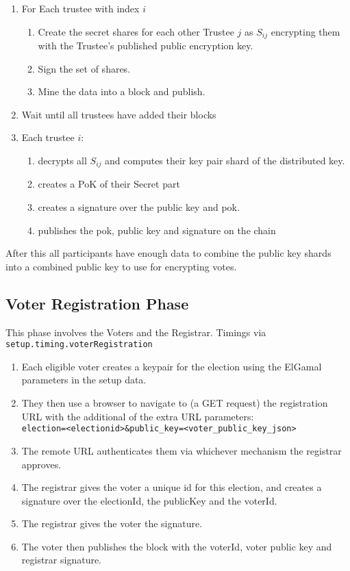 
\begin{enumerate}
    \item For Each trustee with index $i$
          \begin{enumerate}
              \item Create the secret shares for each other Trustee $j$ as $S_{ij}$ encrypting them with the Trustee's published public encryption key.
              \item Sign the set of shares.
              \item Mine the data into a block and publish.
          \end{enumerate}
    \item Wait until all trustees have added their blocks
    \item Each trustee $i$:
          \begin{enumerate}
              \item decrypts all $S_{ij}$ and computes their key pair shard of the distributed key.
              \item creates a PoK of their Secret part
              \item creates a signature over the public key and pok.
              \item publishes the pok, public key and signature on the chain
          \end{enumerate}
\end{enumerate}

After this all participants have enough data to combine the public key shards into a combined public key to use for encrypting votes.

\subsection{Voter Registration Phase}
\label{ch:astris:detail:registration}

This phase involves the Voters and the Registrar. Timings via \texttt{setup.timing.voterRegistration}


\begin{enumerate}
    \item Each eligible voter creates a keypair for the election using the ElGamal parameters in the setup data.
    \item They then use a browser to navigate to (a GET request) the registration URL with the additional of the extra URL parameters:\\ \verb|election=<electionid>&public_key=<voter_public_key_json>|
    \item The remote URL authenticates them via whichever mechanism the registrar approves.
    \item The registrar gives the voter a unique id for this election, and creates a signature over the electionId, the publicKey and the voterId.
    \item The registrar gives the voter the signature.
    \item The voter then publishes the block with the voterId, voter public key and registrar signature.
\end{enumerate}

